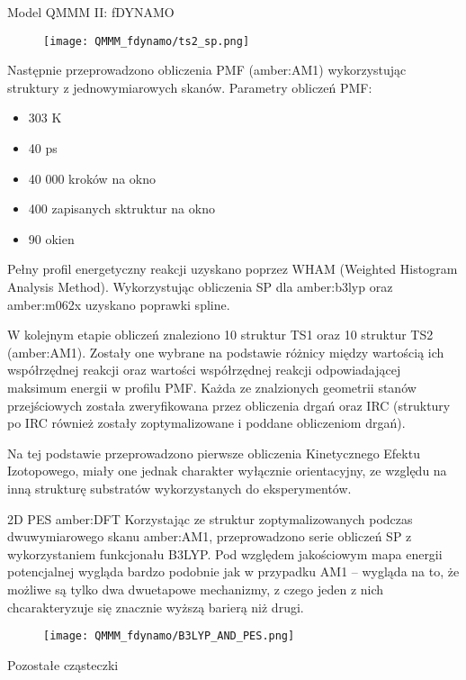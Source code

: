 \begin{section}{Model QMMM II: fDYNAMO}
 \begin{figure}[H]
  \texttt{[image: QMMM\_fdynamo/ts2\_sp.png]}
\end{figure}

Następnie przeprowadzono obliczenia PMF (amber:AM1) wykorzystując struktury z jednowymiarowych skanów. Parametry obliczeń PMF:
\begin{itemize}
 \item 303 K
 \item 40 ps 
 \item 40 000 kroków na okno
 \item 400 zapisanych sktruktur na okno
 \item 90 okien
\end{itemize}

Pełny profil energetyczny reakcji uzyskano poprzez WHAM (Weighted Histogram Analysis Method). Wykorzystując obliczenia SP dla amber:b3lyp oraz amber:m062x uzyskano poprawki spline.

W kolejnym etapie obliczeń znaleziono 10 struktur TS1 oraz 10 struktur TS2 (amber:AM1). Zostały one wybrane na podstawie różnicy między wartością ich współrzędnej reakcji oraz wartości współrzędnej reakcji
odpowiadającej maksimum energii w profilu PMF. Każda ze znalzionych geometrii stanów przejściowych została zweryfikowana przez obliczenia drgań oraz IRC (struktury po IRC również zostały zoptymalizowane
i poddane obliczeniom drgań).

Na tej podstawie przeprowadzono pierwsze obliczenia Kinetycznego Efektu Izotopowego, miały one jednak charakter wyłącznie orientacyjny, ze względu na inną strukturę substratów wykorzystanych do 
eksperymentów.

\begin{subsection}{2D PES amber:DFT}
Korzystając ze struktur zoptymalizowanych podczas dwuwymiarowego skanu amber:AM1, przeprowadzono serie obliczeń SP z wykorzystaniem funkcjonału B3LYP. Pod względem jakościowym mapa energii potencjalnej wygląda
bardzo podobnie jak w przypadku AM1 -- wygląda na to, że możliwe są tylko dwa dwuetapowe mechanizmy, z czego jeden z nich chcarakteryzuje się znacznie wyższą barierą niż drugi.

 \begin{figure}[H]
  \texttt{[image: QMMM\_fdynamo/B3LYP\_AND\_PES.png]}
\end{figure}
 
\end{subsection}

\begin{subsection} { Pozostałe cząsteczki }


\end{subsection}
\end{section}
